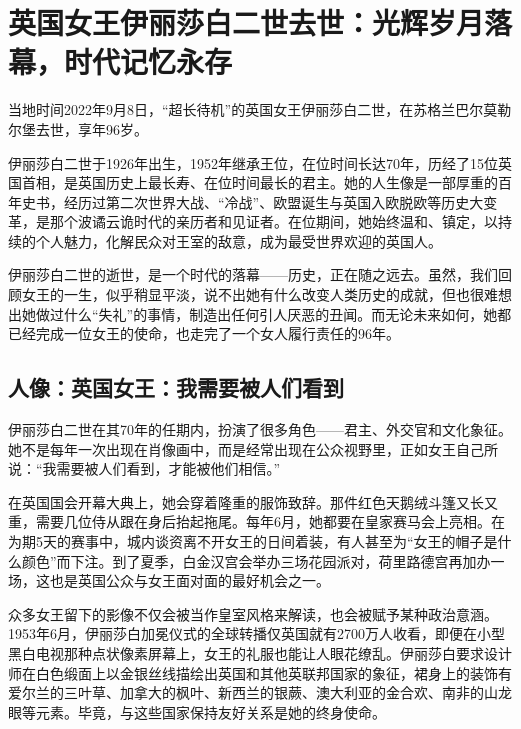 
\section*{英国女王伊丽莎白二世去世：光辉岁月落幕，时代记忆永存}

当地时间2022年9月8日，“超长待机”的英国女王伊丽莎白二世，在苏格兰巴尔莫勒尔堡去世，享年96岁。

伊丽莎白二世于1926年出生，1952年继承王位，在位时间长达70年，历经了15位英国首相，是英国历史上最长寿、在位时间最长的君主。她的人生像是一部厚重的百年史书，经历过第二次世界大战、“冷战”、欧盟诞生与英国入欧脱欧等历史大变革，是那个波谲云诡时代的亲历者和见证者。在位期间，她始终温和、镇定，以持续的个人魅力，化解民众对王室的敌意，成为最受世界欢迎的英国人。

伊丽莎白二世的逝世，是一个时代的落幕——历史，正在随之远去。虽然，我们回顾女王的一生，似乎稍显平淡，说不出她有什么改变人类历史的成就，但也很难想出她做过什么“失礼”的事情，制造出任何引人厌恶的丑闻。而无论未来如何，她都已经完成一位女王的使命，也走完了一个女人履行责任的96年。

\subsection*{人像：英国女王：我需要被人们看到}

伊丽莎白二世在其70年的任期内，扮演了很多角色——君主、外交官和文化象征。她不是每年一次出现在肖像画中，而是经常出现在公众视野里，正如女王自己所说：“我需要被人们看到，才能被他们相信。”

在英国国会开幕大典上，她会穿着隆重的服饰致辞。那件红色天鹅绒斗篷又长又重，需要几位侍从跟在身后抬起拖尾。每年6月，她都要在皇家赛马会上亮相。在为期5天的赛事中，城内谈资离不开女王的日间着装，有人甚至为“女王的帽子是什么颜色”而下注。到了夏季，白金汉宫会举办三场花园派对，荷里路德宫再加办一场，这也是英国公众与女王面对面的最好机会之一。

众多女王留下的影像不仅会被当作皇室风格来解读，也会被赋予某种政治意涵。1953年6月，伊丽莎白加冕仪式的全球转播仅英国就有2700万人收看，即便在小型黑白电视那种点状像素屏幕上，女王的礼服也能让人眼花缭乱。伊丽莎白要求设计师在白色缎面上以金银丝线描绘出英国和其他英联邦国家的象征，裙身上的装饰有爱尔兰的三叶草、加拿大的枫叶、新西兰的银蕨、澳大利亚的金合欢、南非的山龙眼等元素。毕竟，与这些国家保持友好关系是她的终身使命。

